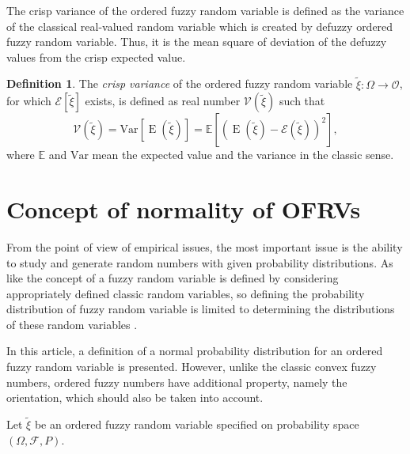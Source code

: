 \documentclass[review]{elsarticle}
\theoremstyle{definition}
\newtheorem{definition}{Definition}
\theoremstyle{theorem}
\DeclareMathOperator*{\E}{E}
\begin{document}
The crisp variance of the ordered fuzzy random variable is defined as the variance of the classical real-valued random variable which is created by defuzzy ordered fuzzy random variable. Thus, it is the mean square of deviation of the defuzzy values from the crisp expected value. 

\begin{definition}
\label{def:owar}
The {\it crisp variance} of the ordered fuzzy random variable \linebreak $\tilde{\xi}\colon\Omega\to\mathcal{O}$, for which $\mathcal{E}[\tilde{\xi}]$ exists, is defined as real number $\mathcal{V}(\tilde{\xi})$ such that
\begin{equation}
\mathcal{V}(\tilde{\xi})=\mathrm{Var}[\E(\tilde{\xi})]=\mathbb{E}\left[\left(\E(\tilde{\xi})-\mathcal{E}(\tilde{\xi})\right)^2\right],
\end{equation}
where $\mathbb{E}$ and $\mathrm{Var}$ mean the expected value and the variance in the classic sense. 
\end{definition}

\section{Concept of normality of OFRVs}
From the point of view of empirical issues, the most important issue is the ability to study and generate random numbers with given probability distributions. As like the concept of a fuzzy random variable is defined by considering appropriately defined classic random variables, so defining the probability distribution of fuzzy random variable is limited to determining the distributions of these random variables \cite{puri1985,wu2009,gil2006,colubi2002,colubi2007}.

In this article, a definition of a normal probability distribution for an ordered fuzzy random variable is presented. However, unlike the classic convex fuzzy numbers, ordered fuzzy numbers have additional property, namely the orientation, which should also be taken into account.

Let $\tilde{\xi}$ be an ordered fuzzy random variable specified on probability space $(\Omega,\mathcal{F},P)$.
\end{document}
